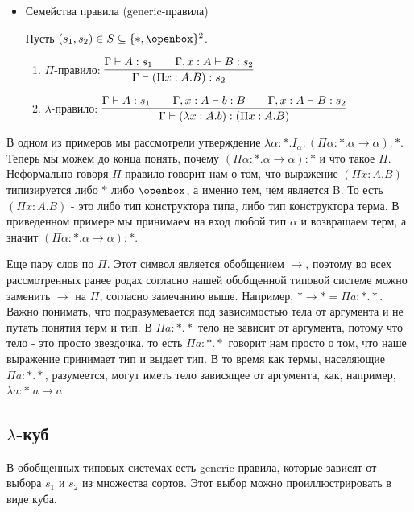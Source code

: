 \begin{itemize}
\item Семейства правила (generic-правила)

Пусть $(s_1, s_2) \in S \subseteq \{*, \openbox\}^2$.

\begin{enumerate}
    \item $\Pi$-правило: $\vcenter{\infer[]{\Gamma \vdash (\Pi x : A.B) : s_2}{\Gamma \vdash A : s_1 \qquad \Gamma, x : A \vdash B : s_2}}$
    \item $\lambda$-правило: $\vcenter{\infer[]{\Gamma \vdash (\lambda x : A . b) : (\Pi x : A. B)}{\Gamma \vdash A:s_1 \qquad \Gamma, x : A \vdash b : B \qquad \Gamma, x : A \vdash B : s_2}}$
\end{enumerate}

\end{itemize}

В одном из примеров мы рассмотрели утверждение $\lambda \alpha : *.I_\alpha : (\Pi \alpha : * . \alpha \rightarrow \alpha):*$. Теперь мы можем до конца понять, почему $(\Pi \alpha : * . \alpha \rightarrow \alpha):*$ и что такое $\Pi$. Неформально говоря $\Pi$-правило говорит нам о том, что выражение $(\Pi x : A.B)$ типизируется либо $*$ либо $\openbox$, а именно тем, чем является B. То есть $(\Pi x : A.B)$ - это либо тип конструктора типа, либо тип конструктора терма. В приведенном примере мы принимаем на вход любой тип $\alpha$  и возвращаем терм, а значит $(\Pi \alpha : * . \alpha \rightarrow \alpha):*$.

Еще пару слов по $\Pi$. Этот символ является обобщением $\rightarrow$, поэтому во всех рассмотренных ранее родах согласно нашей обобщенной типовой системе можно заменить $\rightarrow$ на $\Pi$, согласно замечанию выше. Например, $* \rightarrow * = \Pi a : *. *$. Важно понимать, что подразумевается под зависимостью тела от аргумента и не путать понятия терм и тип. В $\Pi a : *. *$ тело не зависит от аргумента, потому что тело - это просто звездочка, то есть  $\Pi a : *. *$ говорит нам просто о том, что наше выражение принимает тип и выдает тип. В то время как термы, населяющие $\Pi a : *. *$, разумеется, могут иметь тело зависящее от аргумента, как, например, $\lambda a : *. a \rightarrow a$

\subsection{$\lambda$-куб}

В обобщенных типовых системах есть generic-правила, которые зависят от выбора $s_1$ и $s_2$ из множества сортов. Этот выбор можно проиллюстрировать в виде куба.


